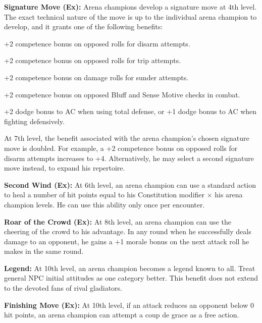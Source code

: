 {\textbf{Signature Move (Ex):} Arena champions develop a signature move at 4th level. The exact technical nature of the move is up to the individual arena champion to develop, and it grants one of the following benefits:
\begin{itemize*}
\item +2 competence bonus on opposed rolls for disarm attempts.
\item +2 competence bonus on opposed rolls for trip attempts.
\item +2 competence bonus on damage rolls for sunder attempts.
\item +2 competence bonus on opposed Bluff and Sense Motive checks in combat.
\item +2 dodge bonus to AC when using total defense, or +1 dodge bonus to AC when fighting defensively.
\end{itemize*}

At 7th level, the benefit associated with the arena champion's chosen signature move is doubled. For example, a +2 competence bonus on opposed rolls for disarm attempts increases to +4. Alternatively, he may select a second signature move instead, to expand his repertoire.

\textbf{Second Wind (Ex):} At 6th level, an arena champion can use a standard action to heal a number of hit points equal to his Constitution modifier $\times$ his arena champion levels. He can use this ability only once per encounter.

\textbf{Roar of the Crowd (Ex):} At 8th level, an arena champion can use the cheering of the crowd to his advantage. In any round when he successfully deals damage to an opponent, he gains a +1 morale bonus on the next attack roll he makes in the same round.

\textbf{Legend:} At 10th level, an arena champion becomes a legend known to all. Treat general NPC initial attitudes as one category better. This benefit does not extend to the devoted fans of rival gladiators.

\textbf{Finishing Move (Ex):} At 10th level, if an attack reduces an opponent below 0 hit points, an arena champion can attempt a coup de grace as a free action.
}

